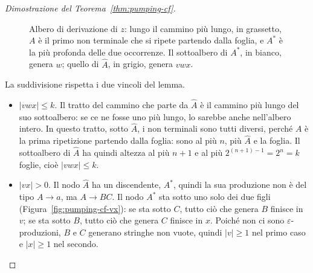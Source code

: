 \documentclass[a4paper, 11pt, oneside]{book}
\theoremstyle{formale}
\begin{document}
\begin{proof}[Dimostrazione del Teorema~\ref{thm:pumping-cf}]
\begin{figure}[H]
            \caption{Albero di derivazione di $z$: lungo il cammino pi\`u lungo, in
                grassetto, $A$ \`e il primo non terminale che si ripete partendo dalla
                foglia, e $A^*$ \`e la pi\`u profonda delle due occorrenze. Il sottoalbero
                di $A^*$, in bianco, genera $w$; quello di $\hat{A}$, in grigio, genera
                $vwx$.}
            \label{fig:pumping-cf-albero}
        \end{figure}

        La suddivisione rispetta i due vincoli del lemma.
        \begin{itemize}
            \item $|vwx| \leq k$. Il tratto del cammino che parte da $\hat{A}$ \`e il
                cammino pi\`u lungo del suo sottoalbero: se ce ne fosse uno pi\`u lungo,
                lo sarebbe anche nell'albero intero. In questo tratto, sotto $\hat{A}$, i
                non terminali sono tutti diversi, perch\'e $A$ \`e la prima ripetizione
                partendo dalla foglia: sono al pi\`u $n$, pi\`u $\hat{A}$ e la foglia. Il
                sottoalbero di $\hat{A}$ ha quindi altezza al pi\`u
                $n + 1$ e al pi\`u $2^{(n+1)-1} = 2^n = k$ foglie, cio\`e
                $|vwx| \leq k$.
            \item $|vx| > 0$. Il nodo $\hat{A}$ ha un discendente, $A^*$, quindi la sua
                produzione non \`e del tipo $A \to a$, ma $A \to BC$. Il nodo $A^*$ sta
                sotto uno solo dei due figli (Figura~\ref{fig:pumping-cf-vx}): se sta
                sotto $C$, tutto ci\`o che genera $B$ finisce in $v$; se sta sotto $B$,
                tutto ci\`o che genera $C$ finisce in $x$. Poich\'e non ci sono
                $\varepsilon$-produzioni, $B$ e $C$ generano stringhe non vuote, quindi
                $|v| \geq 1$ nel primo caso e $|x| \geq 1$ nel secondo.
        \end{itemize}

        \begin{figure}[H]
            \centering
\end{figure}
\end{proof}
\end{document}
